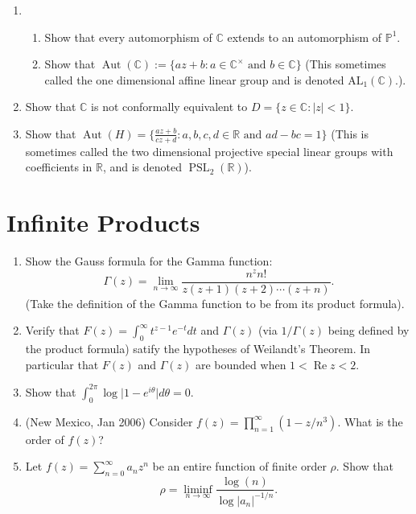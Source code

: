 \documentclass[a4paper,10pt]{article}
\newcommand{\RR}{\mathbb{R}}
\newcommand{\CC}{\mathbb{C}}
\newcommand{\PSL}{\operatorname{PSL}}
\renewcommand{\Re}{\operatorname{Re}}
\newcommand{\PP}{\mathbb{P}}
\newcommand{\Aut}{\operatorname{Aut}}
\begin{document}
\begin{enumerate}
\item 
\begin{enumerate}
	\item Show that every automorphism of $\CC$ extends to an automorphism of $\PP^1$.
	\item Show that $\Aut(\CC):= \lbrace az+b : a \in \CC^{\times} \mbox{ and } b\in \CC \rbrace$ (This sometimes called the one dimensional affine linear group and is denoted $\mathrm{AL}_1(\CC)$.).
\end{enumerate}

\item Show that $\CC$ is not conformally equivalent to $D = \lbrace z \in \CC: \vert z \vert < 1 \rbrace$. 

\item Show that $\Aut(H) = \lbrace \frac{az+b}{cz+d}: a,b,c,d\in \RR \mbox{ and } ad-bc =1 \rbrace$ (This is sometimes called the two dimensional projective special linear groups with coefficients in $\RR$, and is denoted $\PSL_2(\RR)$).

\end{enumerate}

\newpage
\section{Infinite Products}

\begin{enumerate}
	\item Show the Gauss formula for the Gamma function:
	$$ \Gamma(z) = \lim_{n\to\infty} \frac{n^z n!}{z(z+1)(z+2) \cdots (z+n)}. $$
	(Take the definition of the Gamma function to be from its product formula).
	\item Verify that $F(z) = \int_0^{\infty} t^{z-1}e^{-t}dt$ and $\Gamma(z)$ (via $1/\Gamma(z)$ being defined by the product formula) satify the hypotheses of Weilandt's Theorem. In particular that $F(z)$ and $\Gamma(z)$ are bounded when $1 <\Re z <2$. 
	
	\item Show that $\int_0^{2\pi} \log \vert 1 - e^{i\theta}\vert d\theta=0$.
	
	\item (New Mexico, Jan 2006)
	Consider $f(z) = \prod_{n=1}^{\infty}(1-z/n^3)$.
	What is the order of $f(z)$?
	
	\item Let $f(z) = \sum_{n=0}^{\infty} a_n z^n$ 
	be an entire function of finite order $\rho$. Show that 
	$$ \rho = \liminf_{n\to\infty} \frac{\log(n)}{\log \vert a_n \vert^{-1/n}}.$$
\end{enumerate}
\end{document}
